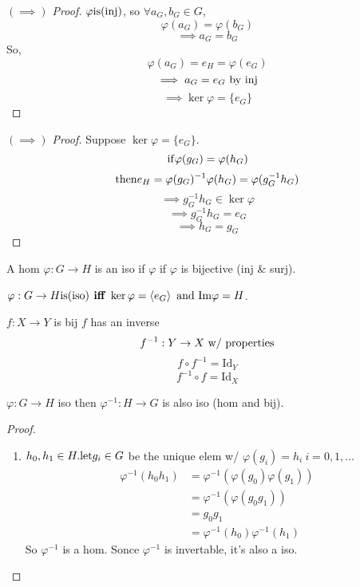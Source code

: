 \documentclass[12pt]{article}
\newcommand{\id}[1][]{\mathrm{Id}}
\newcommand\im{\TR{Im}}
\newcommand\vphi{\varphi}
\begin{document}
\bboxproof
\begin{proof}[\((\implies)\) Proof]
    \(\vphi\is\TM{inj}\), so \(\forall a_G,b_G\in G\),
    \[
        \vphi(a_G)=\vphi(b_G)
    \]
    \[
        \implies a_G=b_G
    \]
    So,
    \[
        \vphi(a_G)=e_H=\vphi(e_G)
    \]
    \[
        \implies a_G=e_G\text{ by inj}
    \]
    \[
        \implies \ker\vphi = \{e_G\}
    \]
\end{proof}
\ebox

\bboxproof
\begin{proof}[\((\implies)\) Proof]
    Suppose \(\ker\vphi=\{e_G\}\). 
    \[
        \iif\vphi(g_G)=\vphi(h_G)
    \]
    \[
        \tthen e_H = \vphi(g_G)^{-1}\vphi(h_G)=\vphi(g_G^{-1}h_G)
    \]
    \[
        \implies g_G^{-1}h_G\in\ker\vphi
    \]
    \[
        \implies g^{-1}_Gh_G=e_G
    \]
    \[
        \implies h_G=g_G
    \]
\end{proof}
\ebox

A hom \(\vphi:G\to H\) is an iso if \(\vphi\) if
\(\vphi\) is bijective (inj \& surj).

\bboxcoro
\begin{coro}[Isomorphic]
    \(\vphi:G\to H\is\TM{iso}\TB{ iff }
    \ker\vphi=\gen{e_G}\T{ and }
    \im\vphi=H\).
\end{coro}
\ebox

\bboxnote
\begin{note}
    \(f:X\to Y\) is bij  \(f\) has an inverse
    \[
        f^{-1}:Y \to X \text{ w/ properties}
    \]
    \[
        f\circ f^{-1}=\id_Y
    \]
    \[
        f^{-1}\circ f=\id_X
    \]
\end{note}
\ebox

\bboxprop
\begin{prop}
    \(\vphi:G\to H\) iso then \(\vphi^{-1}:H\to G\) is also iso (hom and bij).
\end{prop}
\ebox


\bboxproof
\begin{proof}\
    \begin{enumerate}
        \item \(h_0,h_1\in H.\mathrm{let} g_i\in G\) be the unique elem
            w/ \(\vphi(g_i)=h_i\ i=0,1,\dots\)
            \begin{align*}
                \vphi^{-1}(h_0h_1)
                &=\vphi^{-1}(\vphi(g_0)\vphi(g_1))\\
                &=\vphi^{-1}(\vphi(g_0g_1))\\
                &=g_0g_1\\
                &=\vphi^{-1}(h_0)\vphi^{-1}(h_1)
            \end{align*}
            So \(\vphi^{-1}\) is a hom. Sonce \(\vphi^{-1}\) is invertable,
            it's also a iso.
    \end{enumerate}
\end{proof}
\ebox
\end{document}
